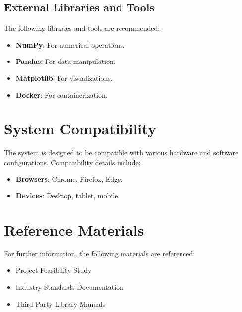 \subsection{External Libraries and Tools}
The following libraries and tools are recommended:
\begin{itemize}
    \item \textbf{NumPy}: For numerical operations.
    \item \textbf{Pandas}: For data manipulation.
    \item \textbf{Matplotlib}: For visualizations.
    \item \textbf{Docker}: For containerization.
\end{itemize}

\section{System Compatibility}
The system is designed to be compatible with various hardware and software configurations. Compatibility details include:
\begin{itemize}
    \item \textbf{Browsers}: Chrome, Firefox, Edge.
    \item \textbf{Devices}: Desktop, tablet, mobile.
\end{itemize}

\section{Reference Materials}
For further information, the following materials are referenced:
\begin{itemize}
    \item Project Feasibility Study
    \item Industry Standards Documentation
    \item Third-Party Library Manuals
\end{itemize}
